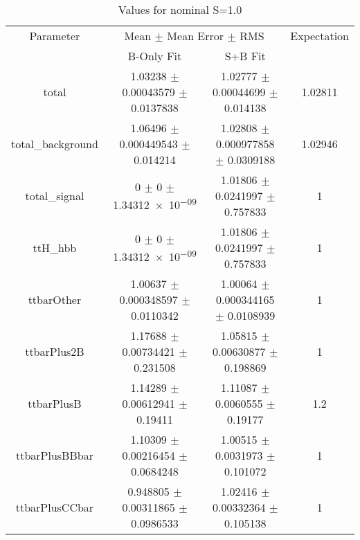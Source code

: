 \begin{table}
\centering
\caption{Values for nominal S=1.0}
\begin{tabular}{cccc}
\toprule
Parameter & \multicolumn{2}{c}{Mean $\pm$ Mean Error $\pm$ RMS} & Expectation\\
 & B-Only Fit & S+B Fit & \\
\midrule
total & \num{1.03238} $\pm$ \num{0.00043579} $\pm$ \num{0.0137838} & \num{1.02777} $\pm$ \num{0.00044699} $\pm$ \num{0.014138} & \num{1.02811}\\
total\_background & \num{1.06496} $\pm$ \num{0.000449543} $\pm$ \num{0.014214} & \num{1.02808} $\pm$ \num{0.000977858} $\pm$ \num{0.0309188} & \num{1.02946}\\
total\_signal & \num{0} $\pm$ \num{0} $\pm$ \num{1.34312e-09} & \num{1.01806} $\pm$ \num{0.0241997} $\pm$ \num{0.757833} & \num{1}\\
ttH\_hbb & \num{0} $\pm$ \num{0} $\pm$ \num{1.34312e-09} & \num{1.01806} $\pm$ \num{0.0241997} $\pm$ \num{0.757833} & \num{1}\\
ttbarOther & \num{1.00637} $\pm$ \num{0.000348597} $\pm$ \num{0.0110342} & \num{1.00064} $\pm$ \num{0.000344165} $\pm$ \num{0.0108939} & \num{1}\\
ttbarPlus2B & \num{1.17688} $\pm$ \num{0.00734421} $\pm$ \num{0.231508} & \num{1.05815} $\pm$ \num{0.00630877} $\pm$ \num{0.198869} & \num{1}\\
ttbarPlusB & \num{1.14289} $\pm$ \num{0.00612941} $\pm$ \num{0.19411} & \num{1.11087} $\pm$ \num{0.0060555} $\pm$ \num{0.19177} & \num{1.2}\\
ttbarPlusBBbar & \num{1.10309} $\pm$ \num{0.00216454} $\pm$ \num{0.0684248} & \num{1.00515} $\pm$ \num{0.0031973} $\pm$ \num{0.101072} & \num{1}\\
ttbarPlusCCbar & \num{0.948805} $\pm$ \num{0.00311865} $\pm$ \num{0.0986533} & \num{1.02416} $\pm$ \num{0.00332364} $\pm$ \num{0.105138} & \num{1}\\
\bottomrule
\end{tabular}
\end{table}